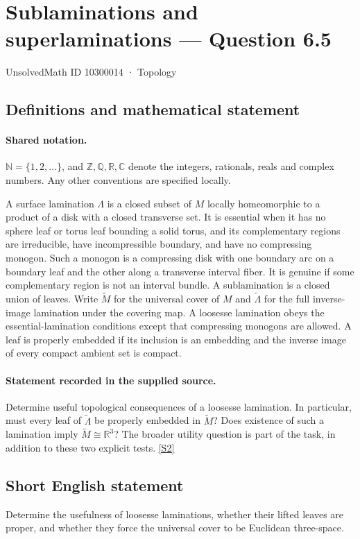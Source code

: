 \documentclass[11pt]{article}
\newcommand{\sref}[2]{\hyperlink{source:#1:#2}{[S#2]}}
\begin{document}
\setcounter{section}{10300013}
\section{Sublaminations and superlaminations — Question 6.5}\label{10300014}
{\small\sffamily UnsolvedMath ID 10300014 · Topology}
\subsection{Definitions and mathematical statement}

\paragraph{Shared notation.}$\mathbb N=\{1,2,\ldots\}$, and $\mathbb Z,\mathbb Q,\mathbb R,\mathbb C$ denote the integers, rationals, reals and complex numbers. Any other conventions are specified locally.


A surface lamination $\Lambda$ is a closed subset of $M$ locally homeomorphic to a product of a disk with a closed transverse set. It is essential when it has no sphere leaf or torus leaf bounding a solid torus, and its complementary regions are irreducible, have incompressible boundary, and have no compressing monogon. Such a monogon is a compressing disk with one boundary arc on a boundary leaf and the other along a transverse interval fiber. It is genuine if some complementary region is not an interval bundle. A sublamination is a closed union of leaves. Write $\widetilde M$ for the universal cover of $M$ and $\widetilde\Lambda$ for the full inverse-image lamination under the covering map. A loosesse lamination obeys the essential-lamination conditions except that compressing monogons are allowed. A leaf is properly embedded if its inclusion is an embedding and the inverse image of every compact ambient set is compact.
\paragraph{Statement recorded in the supplied source.}
Determine useful topological consequences of a loosesse lamination. In particular, must every leaf of $\widetilde\Lambda$ be properly embedded in $\widetilde M$? Does existence of such a lamination imply $\widetilde M\cong\mathbb R^3$? The broader utility question is part of the task, in addition to these two explicit tests. \sref{10300014}{2}
\subsection{Short English statement}
Determine the usefulness of loosesse laminations, whether their lifted leaves are proper, and whether they force the universal cover to be Euclidean three-space.
\end{document}
